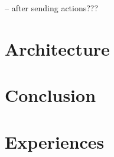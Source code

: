 -- after sending actions???

\section{Architecture}
\label{sec:5.3:FinaArch}

\section{Conclusion}
\label{sec:5.4:Conc}

\section{Experiences}
\label{sec:5.5:Expr}

